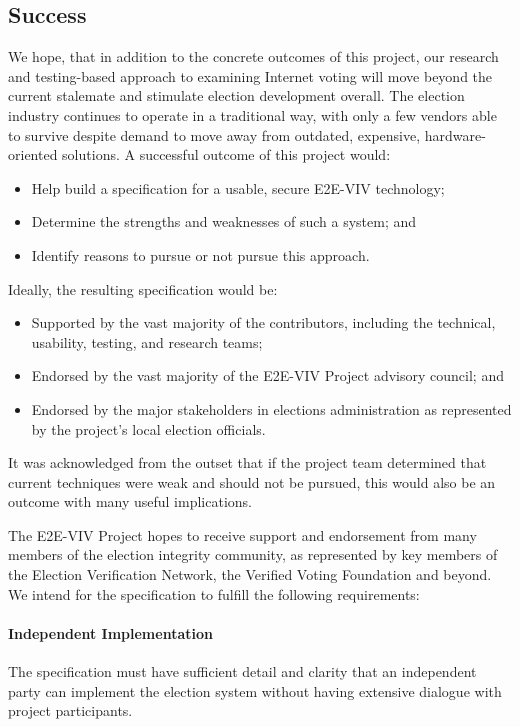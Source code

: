 \subsection{Success}
\label{sec:success}

We hope, that in addition to the concrete outcomes of this project,
our research and testing-based approach to examining Internet voting
will move beyond the current stalemate and stimulate election
development overall. The election industry continues to operate in a
traditional way, with only a few vendors able to survive despite
demand to move away from outdated, expensive, hardware-oriented
solutions. A successful outcome of this project would:

\begin{itemize}
\item Help build a specification for a usable, secure E2E-VIV technology; 
\item Determine the strengths and weaknesses of such a system; and
\item Identify reasons to pursue or not pursue this approach.
\end{itemize}

Ideally, the resulting specification would be:

\begin{itemize}
\item Supported by the vast majority of the contributors, including
  the technical, usability, testing, and research teams; 
\item Endorsed by the vast majority of the E2E-VIV Project advisory
  council; and  
\item Endorsed by the major stakeholders in elections administration
  as represented by the project’s local election officials. 
\end{itemize}

It was acknowledged from the outset that if the project team
determined that current techniques were weak and should not be
pursued, this would also be an outcome with many useful implications. 

The E2E-VIV Project hopes to receive support and endorsement from many
members of the election integrity community, as represented by key
members of the Election Verification Network, the Verified Voting
Foundation and beyond. We intend for the specification to fulfill the
following requirements:

\paragraph{Independent Implementation}
The specification must have sufficient detail and clarity that an
independent party can implement the election system without having
extensive dialogue with project participants.

